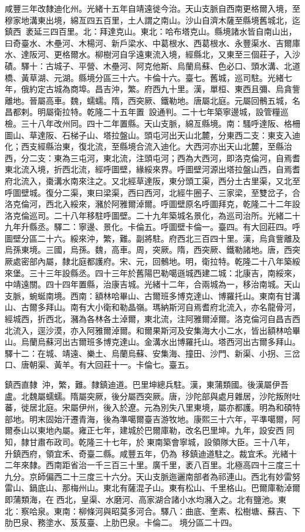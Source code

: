 \begin{pinyinscope}
咸豐三年改隸迪化州。光緒十五年自靖遠徙今治。天山支脈自西南更格爾入境，至穆家地溝東出境，綿亙四五百里，土人謂之南山。沙山自濟木薩至縣境舊城北，迄鎮西，袤延三四百里。北：拜達克山。東北：哈布塔克山。縣境諸水皆自南山出，曰奇臺水、木壘河、木楊河、新戶梁水、中葛根水、西葛根水、永豐渠水、吉爾庫水、達阪河、更格爾水。柳樹河自孚遠東流入境，經縣北，又東至三個莊子，入沙磧。驛十：古城子、平營、木壘河、阿克他斯、烏蘭烏蘇、色必口、頭水溝、北道橋、黃草湖、元湖。縣境分區三十六。卡倫十六。臺七。舊城，巡司駐。光緒七年，俄約定古城為商埠。昌吉沖，繁。府西九十里。漢，單桓、東西且彌、烏貪訾離地。晉屬高車。魏，蠕蠕。隋，西突厥、鐵勒地。唐屬北庭。元屬回鶻五城，名昌都剌。明屬衛拉特。乾隆二十五年置，設通判。二十七年築寧邊城，設管糧巡檢。三十八年改州同。四十二年置縣。天山支脈，綿亙縣境。南：騷呼達阪、格柵圖山、草達阪、石梯子山、塔拉盤山。頭屯河出天山北麓，分東西二支：東支入迪化；西支經縣治東，復北流，至縣境合流入迪化。大西河亦出天山北麓，至縣治西，分二支：東為三屯河，東北流，注頭屯河；西為大西河，即洛克倫河，自焉耆東北流入境，折西北流，經呼圖壁，緣綏來界。呼圖壁河源出塔拉盤山西，自焉耆府北流入，棗溝水南來注之。又北經草達阪，東分頭工渠，西分土古里渠，又北至呼圖壁城。復分二渠，東曰梁渠，西曰西河，北經牛圈子、三家梁，至雙岔子，合洛克倫河，西北入綏來，瀦於阿雅爾淖爾。呼圖壁原名呼圖拜克，乾隆二十二年設洛克倫巡司。二十八年移駐呼圖壁。二十九年築城名景化，為巡司治所。光緒二十九年升縣丞。驛二：寧邊、景化。卡倫五。呼圖壁卡倫一。臺四。有大回莊四。呼圖壁分區二十六。綏來沖，繁，難。副將駐。府西北三百四十里。漢，烏貪訾離及烏孫東境。三國，烏孫。魏，高車。周，突厥。隋，西突厥、鐵勒諸地。唐，西突厥處密部內屬，隸北庭都護府。宋、元，回鶻地。明，衛拉特。乾隆二十八年築綏來堡。三十三年設縣丞。四十三年於舊陽巴勒噶遜城西建二城：北康吉，南綏來，中靖遠關。四十四年置縣，治康吉城。光緒十二年，合兩城為一，移治南城。天山支脈，蜿蜒南境。西南：額林哈畢山、古爾班多博克達山、博羅托山。東南有甘溝山、古爾多拜山。南有大小衛和勒晶嶺。瑪納斯河自焉耆府北流入，亦名龍骨河，經城西，折西北，瀦為各林各土淖爾，東北流，注阿雅爾淖爾。洛克倫河自昌吉西北流入，逕沙漠，亦入阿雅爾淖爾。和爾果斯河及安集海大小二水，皆出額林哈畢山。烏蘭烏蘇河出古爾班多博克達山。金溝水出博羅托山。塔西河出古爾多拜山。驛十二：在城、靖遠、樂土、烏蘭烏蘇、安集海、撞田、沙門、新渠、小拐、三岔口、唐朝渠、黃羊。有大回莊十一。卡倫七。臺五。

鎮西直隸：沖，繁，難。隸鎮迪道。巴里坤總兵駐。漢，東蒲類國。後漢屬伊吾盧。北魏屬蠕蠕。隋屬突厥，後分屬西突厥。唐，沙陀部與處月雜居，沙陀叛附吐蕃，徙居北庭。宋屬伊州，後入於遼。元為別失八里東境，屬亦都護。明為和碩特部地。明末固始汗遷青海，後為準噶爾臺吉游牧地。康熙三十六年，平準噶爾，阿爾泰山以東地內屬。雍正七年，建城於巴爾庫勒，改名巴里坤。九年，設安西同知，隸甘肅布政司。乾隆三十七年，於東南築會寧城，設領隊大臣。三十八年，升鎮西府，領宜禾、奇臺二縣。咸豐五年，仍為，移鎮迪道駐之。裁宜禾。光緒十二年來隸。西南距省治一千三百三十里。廣千里，袤八百里。北極高四十三度三十九分。京師偏西二十三度三十六分。天山支脈迤邐南部者為祁連山。西北有妙雷努雷山、鍋底山、那梅州山。東北有薩混子山。東有松山、千里格山。巴爾庫勒淖爾即蒲類海，在西北，皇渠、水磨河、高家湖合諸小水均瀦入之。北有鹽池。東北：察哈泉。東南：柳條河與昭莫多河合。驛八：曲底、奎素、松樹塘、蘇吉、下肋巴泉、務塗水、芨芨臺、上肋巴泉。卡倫二。境分區二十四。


\end{pinyinscope}

